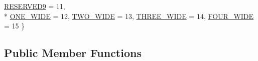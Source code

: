 \begin{DoxyCompactItemize}
\hyperlink{class_graphics_1_1_vertex_data_a50e88236939dc2a3ec4df7aeb728620eaeef1b1af84ab650ca26fcd90ed548642}{R\+E\+S\+E\+R\+V\+E\+D9} = 11, 
\\*
\hyperlink{class_graphics_1_1_vertex_data_a50e88236939dc2a3ec4df7aeb728620eaca1c371d86cb760f697bc8f9269ccc3a}{O\+N\+E\+\_\+\+W\+I\+D\+E} = 12, 
\hyperlink{class_graphics_1_1_vertex_data_a50e88236939dc2a3ec4df7aeb728620eaf411c36479247811d74f8c389cf22a9e}{T\+W\+O\+\_\+\+W\+I\+D\+E} = 13, 
\hyperlink{class_graphics_1_1_vertex_data_a50e88236939dc2a3ec4df7aeb728620eaed7cce23f542ae67236d1f0612bedce3}{T\+H\+R\+E\+E\+\_\+\+W\+I\+D\+E} = 14, 
\hyperlink{class_graphics_1_1_vertex_data_a50e88236939dc2a3ec4df7aeb728620eabcba96d8df23979f402ee0d3fbc22357}{F\+O\+U\+R\+\_\+\+W\+I\+D\+E} = 15
 \}
\end{DoxyCompactItemize}
\subsection*{Public Member Functions}
